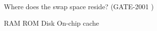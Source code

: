 
\begin{questyle}

  \question  Where does the swap space reside? (GATE-2001 )

  \begin{oneparchoices}
    \choice RAM
    \choice ROM
    \CorrectChoice Disk
    \choice On-chip cache
  \end{oneparchoices}

  \end{questyle}


